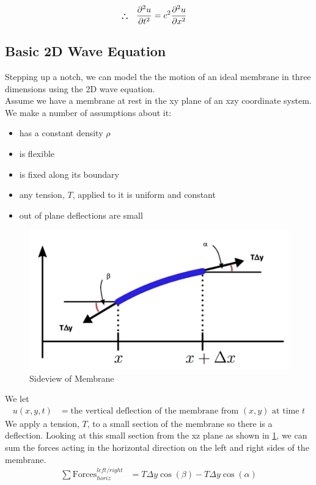 \documentclass[conf]{new-aiaa}
\begin{document}
\begin{align*}
    \bm{\therefore} \hspace{.25cm} \frac{\partial^2 u}{\partial t^2} &= c^2 \frac{\partial^2 u}{\partial x^2}
\end{align*}
\subsection{Basic 2D Wave Equation}
Stepping up a notch, we can model the the motion of an ideal membrane in three dimensions using the 2D wave equation.\\
Assume we have a membrane at rest in the xy plane of an xzy coordinate system. We make a number of assumptions about it:
\begin{itemize}
    \item has a constant density $\rho$
    \item is flexible
    \item is fixed along its boundary
    \item any tension, $T$, applied to it is uniform and constant
    \item out of plane deflections are small
\end{itemize}
\begin{figure}[H]
    \begin{center}
    \includegraphics[width =.4\linewidth]{figures/zx_plane.png}
    \caption{Sideview of Membrane}
    \label{fig_zx}
    \end{center}
\end{figure}
We let 
\begin{align}
    u(x,y,t) &= \text{the vertical deflection of the membrane from $(x,y)$ at time $t$}
\end{align}
We apply a tension, $T$, to a small section of the membrane so there is a deflection. Looking at this small section from the xz plane as shown in \cref{fig_zx}, we can sum the forces acting in the horizontal direction on the left and right sides of the membrane.
\begin{align}
    \sum \text{Forces}_{horiz}^{left/right} &= T\Delta y \cos(\beta) - T\Delta y \cos(\alpha)
\end{align}
\\
\end{document}
